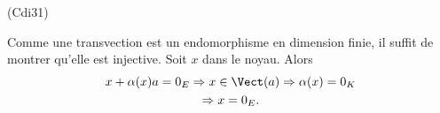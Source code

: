 \begin{tiny}(Cdi31)\end{tiny} Comme une transvection est un endomorphisme en dimension finie, il suffit de montrer qu'elle est injective. 
Soit $x$ dans le noyau. Alors
\begin{multline*}
  x + \alpha(x) a = 0_E \Rightarrow x \in \Vect(a) \Rightarrow \alpha(x) = 0_K \\
  \Rightarrow x = 0_E.
\end{multline*}
